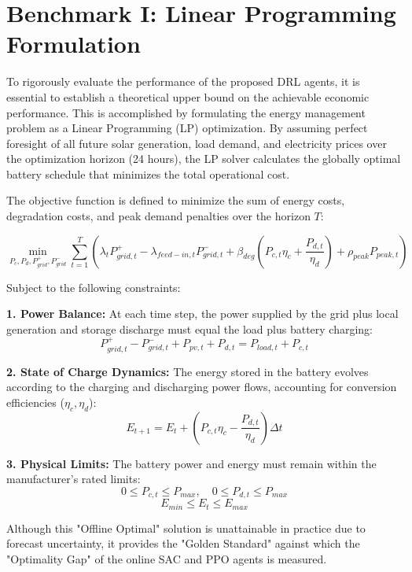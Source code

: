 
\section{Benchmark I: Linear Programming Formulation}

To rigorously evaluate the performance of the proposed DRL agents, it is essential to establish a theoretical upper bound on the achievable economic performance. This is accomplished by formulating the energy management problem as a Linear Programming (LP) optimization. By assuming perfect foresight of all future solar generation, load demand, and electricity prices over the optimization horizon (24 hours), the LP solver calculates the globally optimal battery schedule that minimizes the total operational cost.

The objective function is defined to minimize the sum of energy costs, degradation costs, and peak demand penalties over the horizon $T$:

\begin{equation}
    \min_{P_{c}, P_{d}, P_{grid}^{+}, P_{grid}^{-}} \sum_{t=1}^{T} \left( \lambda_t P_{grid, t}^{+} - \lambda_{feed-in, t} P_{grid, t}^{-} + \beta_{deg}(P_{c, t}\eta_c + \frac{P_{d, t}}{\eta_d}) + \rho_{peak} P_{peak, t} \right)
\end{equation}

Subject to the following constraints:

\textbf{1. Power Balance:} At each time step, the power supplied by the grid plus local generation and storage discharge must equal the load plus battery charging:
\begin{equation}
    P_{grid, t}^{+} - P_{grid, t}^{-} + P_{pv, t} + P_{d, t} = P_{load, t} + P_{c, t}
\end{equation}

\textbf{2. State of Charge Dynamics:} The energy stored in the battery evolves according to the charging and discharging power flows, accounting for conversion efficiencies ($\eta_c, \eta_d$):
\begin{equation}
    E_{t+1} = E_t + (P_{c, t}\eta_c - \frac{P_{d, t}}{\eta_d}) \Delta t
\end{equation}

\textbf{3. Physical Limits:} The battery power and energy must remain within the manufacturer's rated limits:
\begin{equation}
    0 \leq P_{c, t} \leq P_{max}, \quad 0 \leq P_{d, t} \leq P_{max}
\end{equation}
\begin{equation}
    E_{min} \leq E_t \leq E_{max}
\end{equation}

Although this "Offline Optimal" solution is unattainable in practice due to forecast uncertainty, it provides the "Golden Standard" against which the "Optimality Gap" of the online SAC and PPO agents is measured.
